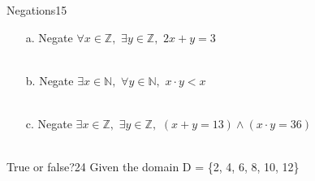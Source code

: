 \documentclass[a4paper,12pt]{book}
\begin{document}
    \begin{answersheetquestion}{5}{Negations}{15}
    \end{answersheetquestion}

        \begin{enumerate}
            \item[a.] Negate $\forall x \in \mathbb{Z},$ \tab[0.2cm] $\exists y \in \mathbb{Z},$ \tab[0.2cm] $2x+y = 3$ \\
                \iftoggle{answerkey}{ \begin{answer}     $\exists x \in \mathbb{Z}, \forall y \in \mathbb{Z}, 2x + y \neq 3$     \end{answer} }{}
            ~\\
            \item[b.] Negate $\exists x \in \mathbb{N},$ \tab[0.2cm] $\forall y \in \mathbb{N},$ \tab[0.2cm] $x \cdot y < x$ \\
                \iftoggle{answerkey}{ \begin{answer}     $\forall x \in \mathbb{N}, \forall y \in \mathbb{N}, x \cdot y \geq x$     \end{answer} }{}
            ~\\
            \item[c.] Negate $\exists x \in \mathbb{Z},$ \tab[0.2cm] $\exists y \in \mathbb{Z},$ \tab[0.2cm] $(x + y = 13) \land (x \cdot y = 36)$ \\
                \iftoggle{answerkey}{ \begin{answer}     $\forall x \in \mathbb{Z}, \forall y \in \mathbb{Z}, (x + y \neq 13) \lor (x \cdot y \neq 36)$     \end{answer} }{}
            ~\\
        \end{enumerate}
        
    \hrulefill
    
    \begin{answersheetquestion}{6}{True or false?}{24}
        Given the domain D = \{2, 4, 6, 8, 10, 12\}
    \end{answersheetquestion}
\end{document}
